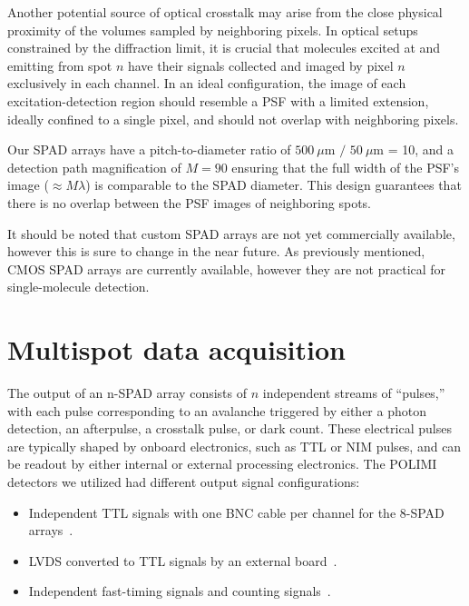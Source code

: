 Another potential source of optical crosstalk may arise from the close physical proximity of the volumes sampled by neighboring pixels. 
In optical setups constrained by the diffraction limit, it is crucial that molecules excited at and emitting from spot $n$ have their signals collected and imaged by pixel $n$ exclusively in each channel. 
In an ideal configuration, the image of each excitation-detection region should resemble a \ac{PSF} with a limited extension, ideally confined to a single pixel, and should not overlap with neighboring pixels.

Our \ac{SPAD} arrays have a pitch-to-diameter ratio of $500~\mu$m $/$ $50~\mu$m = 10, and a detection path magnification of $M = 90$ ensuring that the full width of the \ac{PSF}'s image ($\approx M\lambda$) is comparable to the \ac{SPAD} diameter. 
This design guarantees that there is no overlap between the \ac{PSF} images of neighboring spots.

It should be noted that custom \ac{SPAD} arrays are not yet commercially available, however this is sure to change in the near future. 
As previously mentioned, \ac{CMOS} \ac{SPAD} arrays are currently available, however they are not practical for single-molecule detection.

\section{Multispot data acquisition}
\label{sec:data_acquisition}

The output of an n-\ac{SPAD} array consists of $n$ independent streams of \enquote{pulses,} with each pulse corresponding to an avalanche triggered by either a photon detection, an afterpulse, a crosstalk pulse, or dark count. 
These electrical pulses are typically shaped by onboard electronics, such as \ac{TTL} or \ac{NIM} pulses, and can be readout by either internal or external processing electronics. 
The \ac{POLIMI} detectors we utilized had different output signal configurations:

\begin{itemize}
\item Independent TTL signals with one \ac{BNC}
cable per channel for the 8-\ac{SPAD} arrays~\cite{colyer_BOE_2010,ingargiola_SPIE_2013,ingargiola_PLOS1_2016}.
\item \ac{LVDS} converted to \ac{TTL} signals by an external board~\cite{ingargiola_JCP_2018}.
\item Independent fast-timing signals and counting signals~\cite{ingargiola_SPIE_2017}.
\end{itemize}

